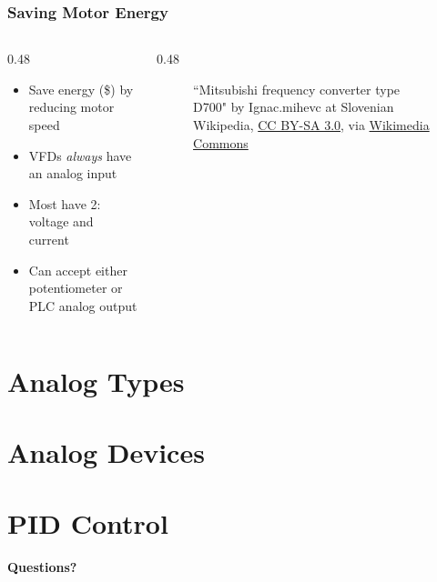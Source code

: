 \begin{frame}
    \frametitle{Saving Motor Energy}

    \begin{columns}
        \begin{column}{0.48\linewidth}
            \begin{itemize}
                \item Save energy (\$) by reducing motor speed
                \item VFDs \emph{always} have an analog input
                \item Most have 2: voltage and current
                \item Can accept either potentiometer or PLC analog output
            \end{itemize}
        \end{column}        
        \begin{column}{0.48\linewidth}
            \begin{figure}
                \centering

                {\tiny ``Mitsubishi frequency converter type D700" by Ignac.mihevc at Slovenian Wikipedia, \href{https://creativecommons.org/licenses/by-sa/3.0}{CC BY-SA 3.0}, via \href{https://commons.wikimedia.org/wiki/File:Mitsubishi_frekven\%C4\%8Dni_pretvornik.jpg}{Wikimedia Commons}\par}
            \end{figure}
        \end{column}
    \end{columns}
\end{frame}

\section{Analog Types}

\section{Analog Devices}

\section{PID Control}

\begin{frame}
    \centering
    {\Huge \textbf{\textcolor{BakerADARed}{Questions?}}}
\end{frame}

